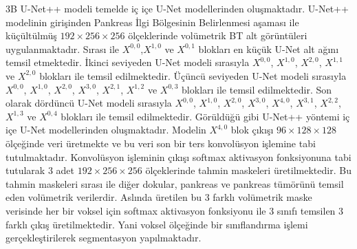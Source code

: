 3B U-Net++ modeli temelde iç içe U-Net modellerinden oluşmaktadır. U-Net++ modelinin girişinden Pankreas İlgi Bölgesinin Belirlenmesi aşaması ile küçültülmüş $192 \times 256 \times 256$ ölçeklerinde volümetrik BT alt görüntüleri uygulanmaktadır. Sırası ile $X^{0,0}$,$X^{1,0}$ ve $X^{0,1}$ blokları en küçük U-Net alt ağını temsil etmektedir. İkinci seviyeden U-Net modeli sırasıyla $X^{0,0}$, $X^{1,0}$, $X^{2,0}$, $X^{1,1}$ ve $X^{2,0}$ blokları ile temsil edilmektedir. Üçüncü seviyeden U-Net modeli sırasıyla $X^{0,0}$, $X^{1,0}$, $X^{2,0}$, $X^{3,0}$, $X^{2,1}$, $X^{1,2}$ ve $X^{0,3}$ blokları ile temsil edilmektedir. Son olarak dördüncü U-Net modeli sırasıyla $X^{0,0}$, $X^{1,0}$, $X^{2,0}$, $X^{3,0}$, $X^{4,0}$, $X^{3,1}$, $X^{2,2}$, $X^{1,3}$ ve $X^{0,4}$ blokları ile temsil edilmektedir. Görüldüğü gibi U-Net++ yöntemi iç içe U-Net modellerinden oluşmaktadır. Modelin $X^{4,0}$ blok çıkışı $96 \times 128 \times 128$ ölçeğinde veri üretmekte ve bu veri son bir ters konvolüsyon işlemine tabi tutulmaktadır. Konvolüsyon işleminin çıkışı softmax aktivasyon fonksiyonuna tabi tutularak 3 adet $192 \times 256 \times 256$ ölçeklerinde tahmin maskeleri üretilmektedir. Bu tahmin maskeleri sırası ile diğer dokular, pankreas ve pankreas tümörünü temsil eden volümetrik verilerdir. Aslında üretilen bu 3 farklı volümetrik maske verisinde her bir voksel için softmax aktivasyon fonksiyonu ile 3 sınıfı temsilen 3 farklı çıkış üretilmektedir. Yani voksel ölçeğinde bir sınıflandırma işlemi gerçekleştirilerek segmentasyon yapılmaktadır.